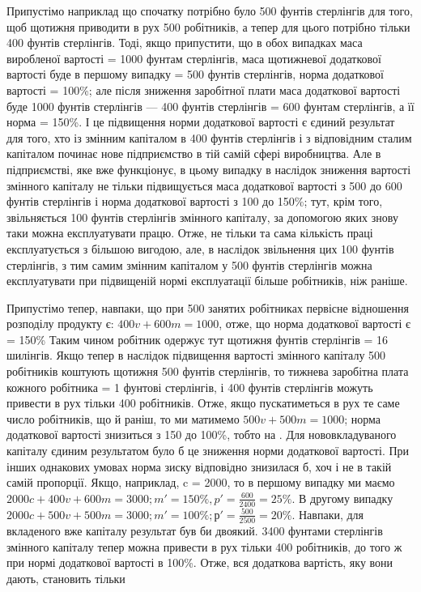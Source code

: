 
Припустімо наприклад що спочатку потрібно було 500 фунтів
стерлінгів для того, щоб щотижня приводити в рух 500 робітників, а тепер для цього потрібно тільки
400 фунтів стерлінгів.
Тоді, якщо припустити, що в обох випадках маса виробленої
вартості = 1000 фунтам стерлінгів, маса щотижневої додаткової вартості буде в першому випадку = 500
фунтів стерлінгів, норма додаткової вартості  = 100\%; але після зниження заробітної плати
маса додаткової вартості буде 1000 фунтів стерлінгів — 400 фунтів стерлінгів = 600 фунтам
стерлінгів, а її норма  = 150\%. І це підвищення норми додаткової вартості є єдиний результат
для того, хто із змінним капіталом в 400 фунтів стерлінгів і з відповідним сталим капіталом починає
нове підприємство в тій самій сфері виробництва. Але в підприємстві, яке вже функціонує, в цьому
випадку в наслідок зниження вартості змінного
капіталу не тільки підвищується маса додаткової вартості з 500
до 600 фунтів стерлінгів і норма додаткової вартості з 100
до 150\%; тут, крім того, звільняється 100 фунтів стерлінгів
змінного капіталу, за допомогою яких знову таки можна експлуатувати працю. Отже, не тільки та сама
кількість праці експлуатується з більшою вигодою, але, в наслідок звільнення цих 100 фунтів
стерлінгів, з тим самим змінним капіталом у 500 фунтів стерлінгів можна експлуатувати при підвищеній
нормі експлуатації більше робітників, ніж раніше.

Припустімо тепер, навпаки, що при 500 занятих робітниках
первісне відношення розподілу продукту є: $400 v + 600 m = 1000$, отже, що норма додаткової вартості є
= 150\% Таким
чином робітник одержує тут щотижня  фунтів стерлінгів = 16 шилінгів. Якщо тепер в наслідок
підвищення вартості
змінного капіталу 500 робітників коштують щотижня 500 фунтів
стерлінгів, то тижнева заробітна плата кожного робітника = 1 фунтові стерлінгів, і 400 фунтів
стерлінгів можуть привести
в рух тільки 400 робітників. Отже, якщо пускатиметься в рух те
саме число робітників, що й раніш, то ми матимемо $500 v + 500 m = 1000$; норма додаткової вартості
знизиться з 150 до 100\%,
тобто на . Для нововкладуваного капіталу єдиним результатом було б це зниження норми додаткової
вартості. При інших
однакових умовах норма зиску відповідно знизилася б, хоч і не
в такій самій пропорції. Якщо, наприклад, c = 2000, то в
першому випадку ми маємо $2000 c + 400 v + 600 m = 3000; m' = 150\%, p' = \frac{600}{2400} = 25\%$. В другому
випадку $2000 c + 500 v + 500 m = 3000; m' = 100\%; р' = \frac{500}{2500} = 20\%$. Навпаки, для вкладеного вже
капіталу результат був би двоякий. 3400 фунтами
стерлінгів змінного капіталу тепер можна привести в рух тільки
400 робітників, до того ж при нормі додаткової вартості в 100\%.
Отже, вся додаткова вартість, яку вони дають, становить тільки
\parbreak{}  %
